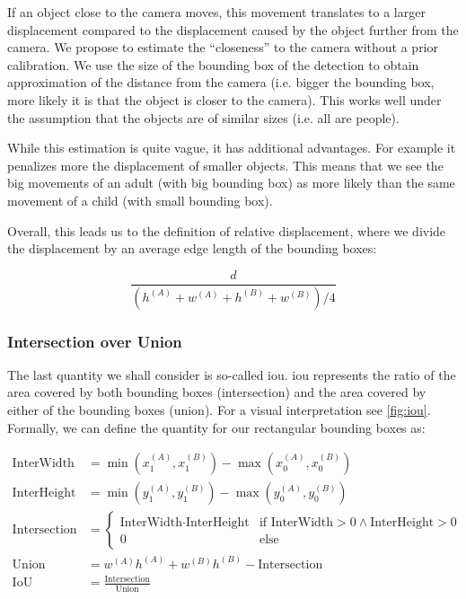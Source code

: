 If an object close to the camera moves, this movement translates to a larger displacement compared to the displacement caused by the object further from the camera. We propose to estimate the ``closeness'' to the camera without a prior calibration. We use the size of the bounding box of the detection to obtain approximation of the distance from the camera (i.e. bigger the bounding box, more likely it is that the object is closer to the camera). This works well under the assumption that the objects are of similar sizes (i.e. all are people).

While this estimation is quite vague, it has additional advantages. For example it penalizes more the displacement of smaller objects. This means that we see the big movements of an adult (with big bounding box) as more likely than the same movement of a child (with small bounding box).

Overall, this leads us to the definition of relative displacement, where we divide the displacement by an average edge length of the bounding boxes:

$$\frac{d}{\left(h^{(A)} + w^{(A)} + h^{(B)} + w^{(B)}\right) / 4}$$

\subsubsection{Intersection over Union}

The last quantity we shall consider is so-called \gls{iou}. \Gls{iou} represents the ratio of the area covered by both bounding boxes (intersection) and the area covered by either of the bounding boxes (union). For a visual interpretation see \autoref{fig:iou}. Formally, we can define the quantity for our rectangular bounding boxes as:

\begin{align*}
    \text{InterWidth} &= \min\left(x_1^{(A)}, x_1^{(B)}\right) - \max\left(x_0^{(A)}, x_0^{(B)}\right) \\
    \text{InterHeight} &= \min\left(y_1^{(A)}, y_1^{(B)}\right) - \max\left(y_0^{(A)}, y_0^{(B)}\right) \\
    \text{Intersection} &= \begin{cases}\text{InterWidth} \cdot \text{InterHeight} & \text{if InterWidth} > 0 \land \text{InterHeight} > 0 \\ 0 & \text{else}\end{cases} \\
    \text{Union} &= w^{(A)} h^{(A)} + w^{(B)} h^{(B)} - \text{Intersection} \\
    \text{IoU} &= \frac{\text{Intersection}}{\text{Union}}
\end{align*}

